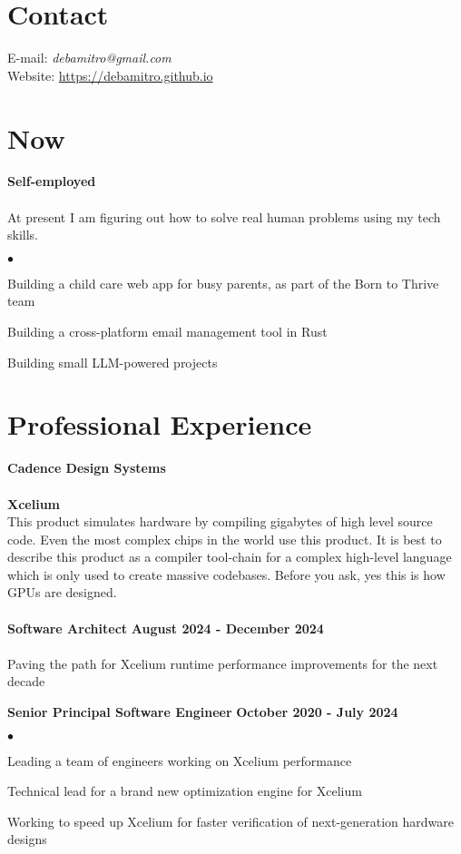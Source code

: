 \documentclass[margin,line]{res}
\newenvironment{list1}{
  \begin{list}{$\bullet$}{%
      \setlength{\itemsep}{0in}
      \setlength{\parsep}{0in} \setlength{\parskip}{0in}
      \setlength{\topsep}{0in} \setlength{\partopsep}{0in}
      \setlength{\leftmargin}{0.17in}}}{\end{list}}
\begin{document}

\begin{resume}


\section{\sc Contact}
E-mail: {\em debamitro@gmail.com} \\
Website: \href{https://debamitro.github.io/}{https://debamitro.github.io}

\section{\sc Now}
{\bf Self-employed} \\ \\
At present I am figuring out how to solve real human problems using my tech skills.
\begin{list1}
    \item Building a child care web app for busy parents, as part of the Born to Thrive team
    \item Building a cross-platform email management tool in Rust
    \item Building small LLM-powered projects
\end{list1}

\section{\sc Professional Experience}
{\bf   Cadence Design Systems} \\ \\
{\bf Xcelium} \\
This product simulates hardware by compiling gigabytes of high level source code. Even the most complex chips in the world use this product. It is best to describe this product as a compiler tool-chain
for a complex high-level language which is only used to create massive codebases. Before you ask, yes this is how GPUs are designed. \\ \\
{\bf Software Architect}
\hfill{\bf August 2024 - December 2024} \\ \\
Paving the path for Xcelium runtime performance improvements for the next decade

{\bf Senior Principal Software Engineer}
\hfill{\bf October 2020 - July 2024} \\
\begin{list1} %
    \item Leading a team of engineers working on Xcelium performance
    \item Technical lead for a brand new optimization engine for Xcelium
    \item Working to speed up Xcelium for faster verification of next-generation hardware designs
\end{list1}


\end{resume}
\end{document}
